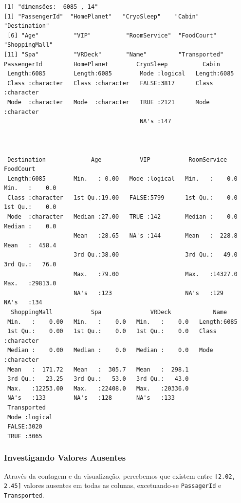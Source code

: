 \documentclass[12pt,a4paper]{article}
\begin{document}
\label{org989791a}
\begin{verbatim}
[1] "dimensões:  6085 , 14"
[1] "PassengerId"  "HomePlanet"   "CryoSleep"    "Cabin"        "Destination" 
 [6] "Age"          "VIP"          "RoomService"  "FoodCourt"    "ShoppingMall"
[11] "Spa"          "VRDeck"       "Name"         "Transported"
PassengerId         HomePlanet        CryoSleep          Cabin          
 Length:6085        Length:6085        Mode :logical   Length:6085       
 Class :character   Class :character   FALSE:3817      Class :character  
 Mode  :character   Mode  :character   TRUE :2121      Mode  :character  
                                       NA's :147                         
                                                                         
                                                                         
                                                                         
 Destination             Age           VIP           RoomService        FoodCourt      
 Length:6085        Min.   : 0.00   Mode :logical   Min.   :    0.0   Min.   :    0.0  
 Class :character   1st Qu.:19.00   FALSE:5799      1st Qu.:    0.0   1st Qu.:    0.0  
 Mode  :character   Median :27.00   TRUE :142       Median :    0.0   Median :    0.0  
                    Mean   :28.65   NA's :144       Mean   :  228.8   Mean   :  458.4  
                    3rd Qu.:38.00                   3rd Qu.:   49.0   3rd Qu.:   76.0  
                    Max.   :79.00                   Max.   :14327.0   Max.   :29813.0  
                    NA's   :123                     NA's   :129       NA's   :134      
  ShoppingMall           Spa              VRDeck            Name          
 Min.   :    0.00   Min.   :    0.0   Min.   :    0.0   Length:6085       
 1st Qu.:    0.00   1st Qu.:    0.0   1st Qu.:    0.0   Class :character  
 Median :    0.00   Median :    0.0   Median :    0.0   Mode  :character  
 Mean   :  171.72   Mean   :  305.7   Mean   :  298.1                     
 3rd Qu.:   23.25   3rd Qu.:   53.0   3rd Qu.:   43.0                     
 Max.   :12253.00   Max.   :22408.0   Max.   :20336.0                     
 NA's   :133        NA's   :128       NA's   :133                         
 Transported    
 Mode :logical  
 FALSE:3020     
 TRUE :3065
\end{verbatim}
\subsubsection{Investigando Valores Ausentes}
\label{sec:org5ed75d4}
Através da contagem e da visualização, percebemos que existem entre \texttt{[2.02, 2.45]} valores ausentes em todas as colunas, excetuando-se \texttt{PassagerId} e \texttt{Transported}.
\end{document}
